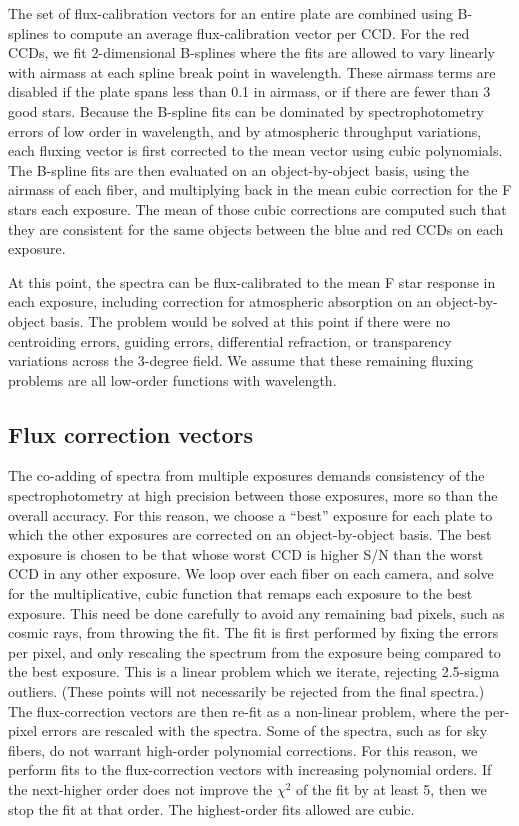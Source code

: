 \documentclass[12pt,preprint]{aastex}
\begin{document}
The set of flux-calibration vectors for an entire plate are combined
using B-splines to compute an average flux-calibration vector per CCD.
For the red CCDs, we fit 2-dimensional B-splines where the fits are
allowed to vary linearly with airmass at each spline break point
in wavelength.  These airmass terms are disabled if the plate spans
less than 0.1 in airmass, or if there are fewer than 3 good stars.
Because the B-spline fits can be dominated by
spectrophotometry errors of low order in wavelength, and by
atmospheric throughput variations, each fluxing
vector is first corrected to the mean vector using cubic polynomials.
The B-spline fits are then evaluated on an object-by-object basis,
using the airmass of each fiber, and multiplying back in the mean
cubic correction for the F stars each exposure.
The mean of those cubic corrections are computed such that they
are consistent for the same objects between the blue and red CCDs
on each exposure.

At this point, the spectra can be flux-calibrated to the mean
F star response in each exposure, including correction for
atmospheric absorption on an object-by-object basis.
The problem would be solved at this point if there were
no centroiding errors, guiding errors, differential refraction,
or transparency variations across the 3-degree field.
We assume that these remaining fluxing problems are all
low-order functions with wavelength.

\subsection{Flux correction vectors}

The co-adding of spectra from multiple exposures demands
consistency of the spectrophotometry at high precision between those
exposures, more so than the overall accuracy.
For this reason, we choose a ``best'' exposure for each plate
to which the other exposures are corrected on an object-by-object basis.
The best exposure is chosen to be that whose worst CCD is higher S/N
than the worst CCD in any other exposure.
We loop over each fiber on each camera, and solve for the multiplicative,
cubic function that remaps each exposure to the best exposure.
This need be done carefully to avoid any remaining bad pixels,
such as cosmic rays, from throwing the fit.
The fit is first performed by fixing the errors per pixel, and only
rescaling the spectrum from the exposure being compared to the best exposure.
This is a linear problem which we iterate, rejecting 2.5-sigma outliers.
(These points will not necessarily be rejected from the final spectra.)
The flux-correction vectors are then re-fit as a non-linear problem,
where the per-pixel errors are rescaled with the spectra.
Some of the spectra, such as for sky fibers, do not warrant high-order
polynomial corrections.  For this reason, we perform fits to the
flux-correction vectors with increasing polynomial orders.
If the next-higher order does not improve the $\chi^2$ of the fit
by at least 5, then we stop the fit at that order.  The highest-order
fits allowed are cubic.
\end{document}
